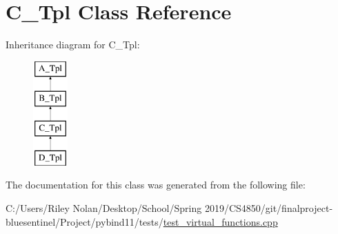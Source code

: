 \hypertarget{class_c___tpl}{}\section{C\+\_\+\+Tpl Class Reference}
\label{class_c___tpl}
Inheritance diagram for C\+\_\+\+Tpl\+:\begin{figure}[H]
\begin{center}
\leavevmode
\includegraphics[height=4.000000cm]{class_c___tpl}
\end{center}
\end{figure}


The documentation for this class was generated from the following file\+:\begin{DoxyCompactItemize}
\item 
C\+:/\+Users/\+Riley Nolan/\+Desktop/\+School/\+Spring 2019/\+C\+S4850/git/finalproject-\/bluesentinel/\+Project/pybind11/tests/\mbox{\hyperlink{test__virtual__functions_8cpp}{test\+\_\+virtual\+\_\+functions.\+cpp}}\end{DoxyCompactItemize}

